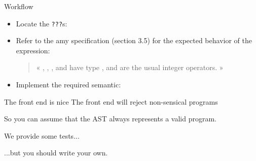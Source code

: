 \documentclass{beamer}
\begin{document}
    \begin{frame}[fragile]{Workflow}
        \begin{itemize}
            \item<1-> 
            Locate the {\footnotesize\texttt{???}}s:

            \item<2-> Refer to the amy specification (section 3.5)
            for the expected behavior of the expression:

            \begin{quote}
                « \gtns{+}, \gtns{-}, \gtns{*}, \gtns{/} and \gtns{\%} 
                have type \typeII{\Int}{\Int}{\Int},
                and are the usual integer operators. »
            \end{quote}

            \item<3-> Implement the required semantic:

        \end{itemize}

    \end{frame}

    \begin{frame}[fragile]{The front end is nice}
        The front end will reject non-sensical 
        programs

        \pause

        \pause



        So you can assume that the AST always represents a valid program.
    \end{frame}

    \begin{frame}{We provide some tests...}

        \vspace{1em}


        \pause
        ...but you should write your own.

    \end{frame}
\end{document}
